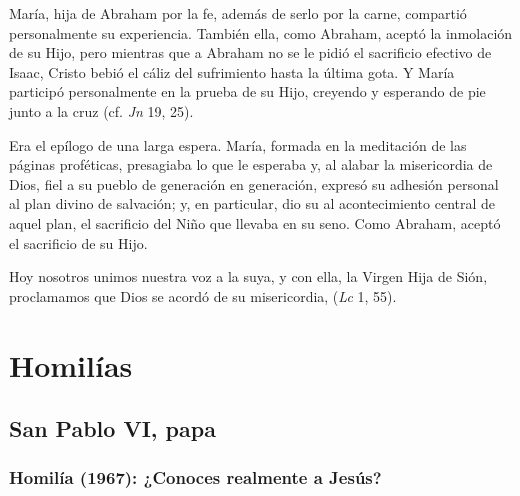 \begin{body}
María, hija de Abraham por la fe, además de serlo por la carne, compartió personalmente su experiencia. También ella, como Abraham, aceptó la inmolación de su Hijo, pero mientras que a Abraham no se le pidió el sacrificio efectivo de Isaac, Cristo bebió el cáliz del sufrimiento hasta la última gota. Y María participó personalmente en la prueba de su Hijo, creyendo y esperando de pie junto a la cruz (cf. \textit{Jn} 19, 25).

Era el epílogo de una larga espera. María, formada en la meditación de las páginas proféticas, presagiaba lo que le esperaba y, al alabar la misericordia de Dios, fiel a su pueblo de generación en generación, expresó su adhesión personal al plan divino de salvación; y, en particular, dio su  al acontecimiento central de aquel plan, el sacrificio del Niño que llevaba en su seno. Como Abraham, aceptó el sacrificio de su Hijo.

Hoy nosotros unimos nuestra voz a la suya, y con ella, la Virgen Hija de Sión, proclamamos que Dios se acordó de su misericordia,  (\textit{Lc} 1, 55).
\end{body}



\newsection
\section{Homilías}

\subsection{San Pablo VI, papa}

\subsubsection{Homilía (1967): ¿Conoces realmente a Jesús?}


